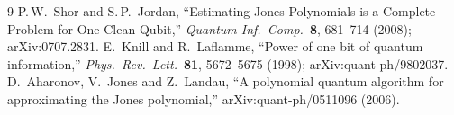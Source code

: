 \documentclass[11pt]{article}
\begin{document}
\begin{thebibliography}{9}
 P.\,W.~Shor and S.\,P.~Jordan, ``Estimating Jones
  Polynomials is a Complete Problem for One Clean Qubit,'' \emph{Quantum
  Inf.~Comp.}~\textbf{8}, 681--714 (2008); arXiv:0707.2831.
 E.~Knill and R.~Laflamme, ``Power of one bit of quantum
  information,'' \emph{Phys.~Rev.~Lett.}~\textbf{81}, 5672--5675 (1998);
  arXiv:quant-ph/9802037.
 D.~Aharonov, V.~Jones and Z.~Landau, ``A polynomial quantum
  algorithm for approximating the Jones polynomial,'' arXiv:quant-ph/0511096
  (2006).
\end{thebibliography}
\end{document}
